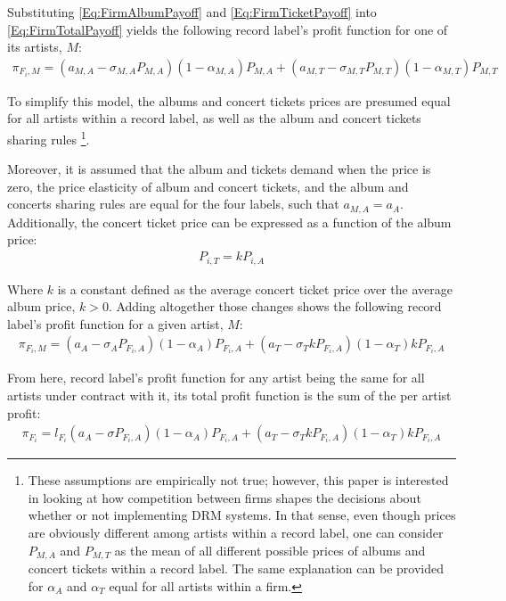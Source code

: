 \documentclass[letter,12pt]{article}
\numberwithin{equation}{section}
\begin{document}
Substituting \eqref{Eq:FirmAlbumPayoff} and \eqref{Eq:FirmTicketPayoff} into \eqref{Eq:FirmTotalPayoff} yields the following record label’s profit function for one of its artists, $M$:
\begin{eqnarray}
\pi_{F_i, M} = (a_{M, A} - \sigma_{M, A} P_{M, A})(1 - \alpha_{M, A}) P_{M, A} +
	(a_{M, T} - \sigma_{M, T} P_{M, T})(1 - \alpha_{M, T}) P_{M, T}
\end{eqnarray}

To simplify this model, the albums and concert tickets prices are presumed equal for all artists within a record label, as well as the album and concert tickets sharing rules \footnote{
These assumptions are empirically not true; however, this paper is interested in looking at how competition between firms shapes the decisions about whether or not implementing DRM systems. In that sense, even though prices are obviously different among artists within a record label, one can consider $P_{M, A}$ and $P_{M, T}$ as the mean of all different possible prices of albums and concert tickets within a record label. The same explanation can be provided for $\alpha_A$ and $\alpha_T$ equal for all artists within a firm.
}.

Moreover, it is assumed that the album and tickets demand when the price is zero, the price elasticity of album and concert tickets, and the album and concerts sharing rules are equal for the four labels, such that $a_{M, A} = a_A$. Additionally, the concert ticket price can be expressed as a function of the album price:
\begin{eqnarray*}
P_{i, T} = k P_{i, A}
\end{eqnarray*}

Where $k$ is a constant defined as the average concert ticket price over the average album price, $k > 0$. Adding altogether those changes shows the following record label’s profit function for a given artist, $M$:
\begin{eqnarray}
\pi_{F_i, M} = (a_A - \sigma_A P_{F_i, A})(1 - \alpha_A) P_{F_i, A} +
	(a_T - \sigma_T k P_{F_i, A}) (1 - \alpha_T) k P_{F_i, A}
\end{eqnarray}

From here, record label’s profit function for any artist being the same for all artists under contract with it, its total profit function is the sum of the per artist profit:
\begin{eqnarray}
\pi_{F_i} = l_{F_i} (a_A - \sigma P_{F_i, A})(1 - \alpha_A) P_{F_i, A} +
	(a_T - \sigma_T k P_{F_i, A})(1 - \alpha_T) k P_{F_i, A}
\end{eqnarray}
\end{document}
